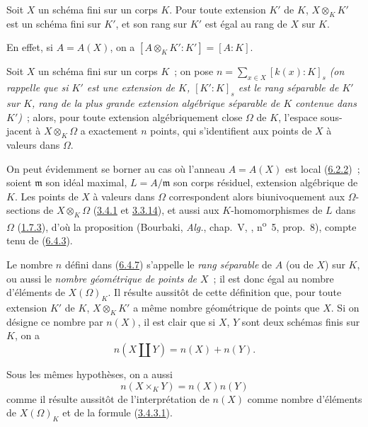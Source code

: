 \begin{corollary}[6.4.6]
\label{I.6.4.6-fr}
Soit $X$ un schéma fini sur un corps $K$. Pour toute extension $K'$ de $K$,
$X\otimes_K K'$ est un schéma fini sur $K'$, et son rang sur $K'$ est égal au
rang de $X$ sur $K$.
\end{corollary}

En effet, si $A=A(X)$, on a $[A\otimes_K K':K']=[A:K]$.

\begin{corollary}[6.4.7]
\label{I.6.4.7-fr}
Soit $X$ un schéma fini sur un corps $K$~; on pose
$n=\sum_{x\in X}[k(x):K]_s$
\emph{(on rappelle que si $K'$ est une extension de $K$, $[K':K]_s$ est le
\emph{rang séparable} de $K'$ sur $K$, rang de la plus grande extension
algébrique séparable de $K$ contenue dans $K'$)}~;
alors, pour toute extension algébriquement close $\Omega$ de $K$, l'espace
sous-jacent à $X\otimes_K\Omega$ a exactement $n$ points, qui s'identifient
aux points de $X$ à valeurs dans $\Omega$.
\end{corollary}

On peut évidemment se borner au cas où l'anneau $A=A(X)$ est local
(\hyperref[I.6.2.2-fr]{6.2.2})~; soient $\mathfrak m$ son idéal maximal,
$L=A/\mathfrak m$ son corps résiduel, extension algébrique de $K$. Les points
de $X$ à valeurs dans $\Omega$ correspondent alors biunivoquement aux
$\Omega$-sections de $X\otimes_K\Omega$
(\hyperref[I.3.4.1-fr]{3.4.1} et \hyperref[I.3.3.14-fr]{3.3.14}), et aussi
aux $K$-homomorphismes de $L$ dans $\Omega$
(\hyperref[I.1.7.3-fr]{1.7.3}), d'où la proposition (Bourbaki, \emph{Alg.},
chap.~V, , n\textsuperscript{o}~5, prop.~8), compte tenu de
(\hyperref[I.6.4.3-fr]{6.4.3}).

\begin{env}[6.4.8]
\label{I.6.4.8-fr}
Le nombre $n$ défini dans (\hyperref[I.6.4.7-fr]{6.4.7}) s'appelle le
\emph{rang séparable} de $A$ (ou de $X$) sur $K$, ou aussi le
\emph{nombre géométrique de points de $X$}~; il est donc égal au nombre
d'éléments de $X(\Omega)_K$. Il résulte aussitôt de cette définition que,
pour toute extension $K'$ de $K$, $X\otimes_K K'$ a même nombre géométrique
de points que $X$. Si on désigne ce nombre par $n(X)$, il est clair que si
$X$, $Y$ sont deux schémas finis sur $K$, on a
\[
  n(X\amalg Y)=n(X)+n(Y).
  \tag{6.4.8.1}\label{I.6.4.8.1-fr}
\]

Sous les mêmes hypothèses, on a aussi
\[
  n(X\times_K Y)=n(X)n(Y)
  \tag{6.4.8.2}\label{I.6.4.8.2-fr}
\]
comme il résulte aussitôt de l'interprétation de $n(X)$ comme nombre
d'éléments de $X(\Omega)_K$ et de la formule
(\hyperref[I.3.4.3.1-fr]{3.4.3.1}).
\end{env}


